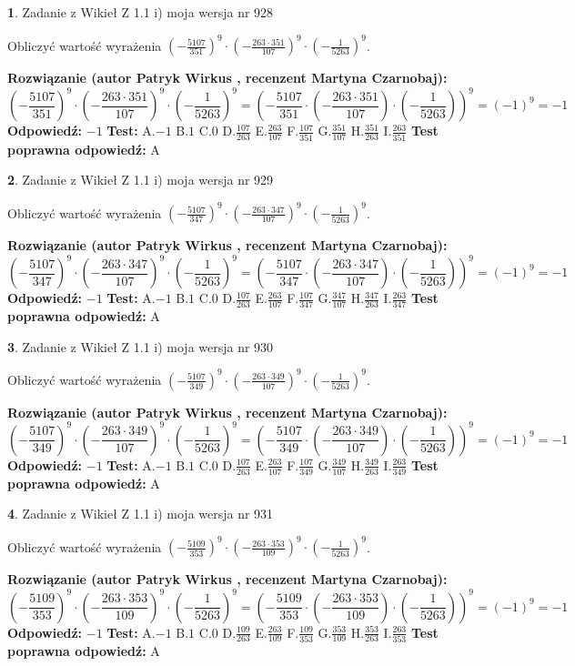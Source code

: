 \documentclass[12pt, a4paper]{article}
\theoremstyle{definition} %
\newtheorem{zad}{}
\newcommand{\zadStart}[1]{\begin{zad}#1\newline}
\newcommand{\zadStop}{\end{zad}}
\newcommand{\rozwStart}[2]{\noindent \textbf{Rozwiązanie (autor #1 , recenzent #2): }\newline}
\newcommand{\rozwStop}{\newline}
\newcommand{\odpStart}{\noindent \textbf{Odpowiedź:}\newline}
\newcommand{\odpStop}{\newline}
\newcommand{\testStart}{\noindent \textbf{Test:}\newline}
\newcommand{\testStop}{\newline}
\newcommand{\kluczStart}{\noindent \textbf{Test poprawna odpowiedź:}\newline}
\newcommand{\kluczStop}{\newline}
\begin{document}
\zadStart{Zadanie z Wikieł Z 1.1 i) moja wersja nr 928}

Obliczyć wartość wyrażenia $(-\frac{5107}{351})^{9} \cdot (-\frac{263 \cdot 351}{107})^{9} \cdot (-\frac{1}{5263})^{9}$.
\zadStop
\rozwStart{Patryk Wirkus}{Martyna Czarnobaj}
$$(-\frac{5107}{351})^{9} \cdot (-\frac{263 \cdot 351}{107})^{9} \cdot (-\frac{1}{5263})^{9} = (-\frac{5107}{351} \cdot (-\frac{263 \cdot 351}{107}) \cdot (-\frac{1}{5263}))^{9} = (-1)^{9} = -1$$
\rozwStop
\odpStart
$-1$
\odpStop
\testStart
A.$-1$ B.$1$ C.$0$ D.$\frac{107}{263}$ E.$\frac{263}{107}$
F.$\frac{107}{351}$ G.$\frac{351}{107}$
H.$\frac{351}{263}$
I.$\frac{263}{351}$
\testStop
\kluczStart
A
\kluczStop



\zadStart{Zadanie z Wikieł Z 1.1 i) moja wersja nr 929}

Obliczyć wartość wyrażenia $(-\frac{5107}{347})^{9} \cdot (-\frac{263 \cdot 347}{107})^{9} \cdot (-\frac{1}{5263})^{9}$.
\zadStop
\rozwStart{Patryk Wirkus}{Martyna Czarnobaj}
$$(-\frac{5107}{347})^{9} \cdot (-\frac{263 \cdot 347}{107})^{9} \cdot (-\frac{1}{5263})^{9} = (-\frac{5107}{347} \cdot (-\frac{263 \cdot 347}{107}) \cdot (-\frac{1}{5263}))^{9} = (-1)^{9} = -1$$
\rozwStop
\odpStart
$-1$
\odpStop
\testStart
A.$-1$ B.$1$ C.$0$ D.$\frac{107}{263}$ E.$\frac{263}{107}$
F.$\frac{107}{347}$ G.$\frac{347}{107}$
H.$\frac{347}{263}$
I.$\frac{263}{347}$
\testStop
\kluczStart
A
\kluczStop



\zadStart{Zadanie z Wikieł Z 1.1 i) moja wersja nr 930}

Obliczyć wartość wyrażenia $(-\frac{5107}{349})^{9} \cdot (-\frac{263 \cdot 349}{107})^{9} \cdot (-\frac{1}{5263})^{9}$.
\zadStop
\rozwStart{Patryk Wirkus}{Martyna Czarnobaj}
$$(-\frac{5107}{349})^{9} \cdot (-\frac{263 \cdot 349}{107})^{9} \cdot (-\frac{1}{5263})^{9} = (-\frac{5107}{349} \cdot (-\frac{263 \cdot 349}{107}) \cdot (-\frac{1}{5263}))^{9} = (-1)^{9} = -1$$
\rozwStop
\odpStart
$-1$
\odpStop
\testStart
A.$-1$ B.$1$ C.$0$ D.$\frac{107}{263}$ E.$\frac{263}{107}$
F.$\frac{107}{349}$ G.$\frac{349}{107}$
H.$\frac{349}{263}$
I.$\frac{263}{349}$
\testStop
\kluczStart
A
\kluczStop



\zadStart{Zadanie z Wikieł Z 1.1 i) moja wersja nr 931}

Obliczyć wartość wyrażenia $(-\frac{5109}{353})^{9} \cdot (-\frac{263 \cdot 353}{109})^{9} \cdot (-\frac{1}{5263})^{9}$.
\zadStop
\rozwStart{Patryk Wirkus}{Martyna Czarnobaj}
$$(-\frac{5109}{353})^{9} \cdot (-\frac{263 \cdot 353}{109})^{9} \cdot (-\frac{1}{5263})^{9} = (-\frac{5109}{353} \cdot (-\frac{263 \cdot 353}{109}) \cdot (-\frac{1}{5263}))^{9} = (-1)^{9} = -1$$
\rozwStop
\odpStart
$-1$
\odpStop
\testStart
A.$-1$ B.$1$ C.$0$ D.$\frac{109}{263}$ E.$\frac{263}{109}$
F.$\frac{109}{353}$ G.$\frac{353}{109}$
H.$\frac{353}{263}$
I.$\frac{263}{353}$
\testStop
\kluczStart
A
\kluczStop
\end{document}
